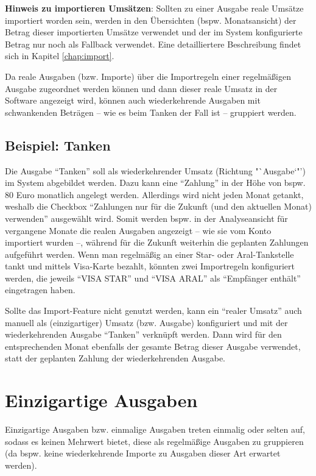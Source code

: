 \begin{infobox}
\textbf{Hinweis zu importieren Umsätzen}: Sollten zu einer Ausgabe reale Umsätze importiert worden sein, werden in den Übersichten (bspw. Monatsansicht) der Betrag dieser importierten Umsätze verwendet und der im System konfigurierte Betrag nur noch als Fallback verwendet. Eine detailliertere Beschreibung findet sich in Kapitel \ref{chap:import}. 
\end{infobox}

Da reale Ausgaben (bzw. Importe) über die Importregeln einer regelmäßigen Ausgabe zugeordnet werden können und dann dieser reale Umsatz in der Software angezeigt wird, können auch wiederkehrende Ausgaben mit schwankenden Beträgen -- wie es beim Tanken der Fall ist -- gruppiert werden.

\subsection*{Beispiel: Tanken}

Die Ausgabe "`Tanken"' soll als wiederkehrender Umsatz (Richtung "`Ausgabe`"') im System abgebildet werden. Dazu kann eine "`Zahlung"' in der Höhe von bspw. 80 Euro monatlich angelegt werden. Allerdings wird nicht jeden Monat getankt, weshalb die Checkbox "`Zahlungen nur für die Zukunft (und den aktuellen Monat) verwenden"' ausgewählt wird. Somit werden bspw. in der Analyseansicht für vergangene Monate die realen Ausgaben angezeigt -- wie sie vom Konto importiert wurden --, während für die Zukunft weiterhin die geplanten Zahlungen aufgeführt werden. Wenn man regelmäßig an einer Star- oder Aral-Tankstelle tankt und mittels Visa-Karte bezahlt, könnten zwei Importregeln konfiguriert werden, die jeweils  "`VISA STAR"' und "`VISA ARAL"' als "`Empfänger enthält"' eingetragen haben. 

Sollte das Import-Feature nicht genutzt werden, kann ein "`realer Umsatz"' auch manuell als (einzigartiger) Umsatz (bzw. Ausgabe) konfiguriert und mit der wiederkehrenden Ausgabe "`Tanken"' verknüpft werden. Dann wird für den entsprechenden Monat ebenfalls der gesamte Betrag dieser Ausgabe verwendet, statt der geplanten Zahlung der wiederkehrenden Ausgabe.


\section{Einzigartige Ausgaben}

Einzigartige Ausgaben bzw. einmalige Ausgaben treten einmalig oder selten auf, sodass es keinen Mehrwert bietet, diese als regelmäßige Ausgaben zu gruppieren (da bspw. keine wiederkehrende Importe zu Ausgaben dieser Art erwartet werden).

